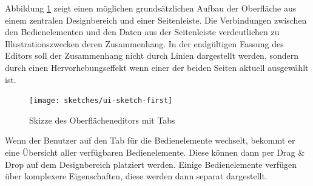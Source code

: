 Abbildung \ref{fig:ui-editor-sketch-first} zeigt einen möglichen grundsätzlichen Aufbau der Oberfläche aus einem zentralen Designbereich und einer Seitenleiste. Die Verbindungen zwischen den Bedienelementen und den Daten aus der Seitenleiste verdeutlichen zu Illustrationszwecken deren Zusammenhang. In der endgültigen Fassung des Editors soll der Zusammenhang nicht durch Linien dargestellt werden, sondern durch einen Hervorhebungseffekt wenn einer der beiden Seiten aktuell ausgewählt ist.


\begin{figure}[h]
  \texttt{[image: sketches/ui-sketch-first]}
  \caption{Skizze des Oberflächeneditors mit Tabs}
  \label{fig:ui-editor-sketch-first}
\end{figure}

Wenn der Benutzer auf den Tab für die Bedienelemente wechselt, bekommt er eine Übersicht aller verfügbaren Bedienelemente. Diese können dann per Drag \& Drop auf dem Designbereich platziert werden. Einige Bedienelemente verfügen über komplexere Eigenschaften, diese werden dann separat dargestellt.

